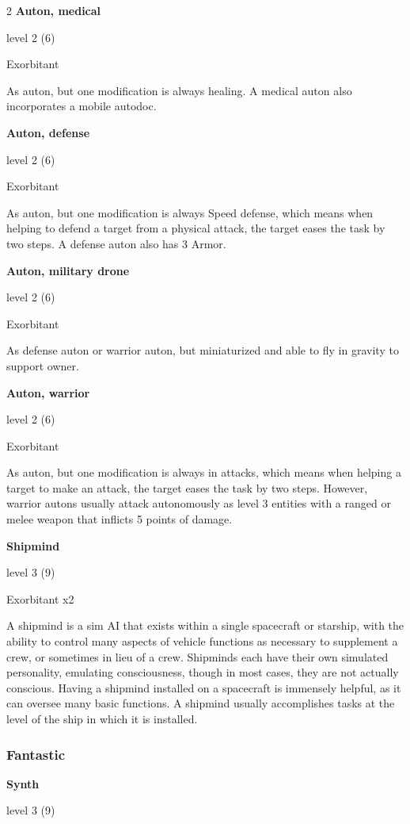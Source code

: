 \begin{multicols}{2}
\textbf{Auton, medical} 

level 2 (6) 

Exorbitant 

As auton, but one modification is always healing. A medical auton also incorporates a mobile autodoc. 

\textbf{Auton, defense} 

level 2 (6) 

Exorbitant 

As auton, but one modification is always Speed defense, which means when helping to defend a target from a physical attack, the target eases the task by two steps. A defense auton also has 3 Armor. 

\textbf{Auton, military drone} 

level 2 (6) 

Exorbitant 

As defense auton or warrior auton, but miniaturized and able to fly in gravity to support owner. 

\textbf{Auton, warrior} 

level 2 (6) 

Exorbitant

As auton, but one modification is always in attacks, which means when helping a target to make an attack, the target eases the task by two steps. However, warrior autons usually attack autonomously as level 3 entities with a ranged or melee weapon that inflicts 5 points of damage. 

\textbf{Shipmind} 

level 3 (9) 

Exorbitant x2 

A shipmind is a sim AI that exists within a single spacecraft or starship, with the ability to control many aspects of vehicle functions as necessary to supplement a crew, or sometimes in lieu of a crew. Shipminds each have their own simulated personality, emulating consciousness, though in most cases, they are not actually conscious. Having a shipmind installed on a spacecraft is immensely helpful, as it can oversee many basic functions. A shipmind usually accomplishes tasks at the level of the ship in which it is installed.

\subsubsection{Fantastic}

\textbf{Synth} 

level 3 (9) 


\end{multicols}
